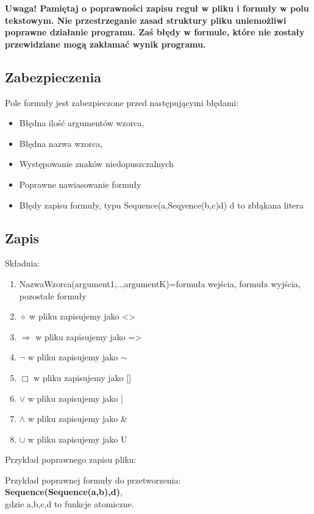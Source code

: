 \documentclass[a4paper, 11pt]{article}
\begin{document}
	\textbf{ Uwaga! Pamiętaj o poprawności zapisu reguł w pliku i formuły w polu tekstowym. Nie przestrzeganie zasad struktury pliku uniemożliwi poprawne działanie programu. Zaś błędy w formule, które nie zostały przewidziane mogą zakłamać wynik programu.}
	
	
	
	\subsection{Zabezpieczenia}
	Pole formuły jest zabezpieczone przed następującymi błędami:
	\begin{itemize}
	\item Błędna ilość argumentów wzorca,
	\item Błędna nazwa wzorca,
	\item Występowanie znaków niedopuszczalnych
	\item Poprawne nawiasowanie formuły
	\item Błędy zapisu formuły, typu Sequence(a,Seqyence(b,c)d) d to zbłąkana litera
	\end{itemize}
	\subsection{Zapis}
	Składnia:
		\begin{enumerate}
		\item NazwaWzorca(argument1,..,argumentK)={formuła wejścia, formuła wyjścia, pozostałe formuły}
		\item $ \diamond $ w pliku zapisujemy jako <>
		\item $\Rightarrow $ w pliku zapisujemy jako =>
		\item $\neg$ w pliku zapisujemy jako $\sim $
		\item $ \Box $ w pliku zapisujemy jako []
		\item $\vee $ w pliku zapisujemy jako |
		\item $ \wedge $ w pliku zapisujemy jako \&
		\item $\cup$ w pliku zapisujemy jako U
		
		\end{enumerate}
	
	
	Przykład poprawnego zapisu pliku:
	

	Przykład poprawnej formuły do przetworzenia:\\
	\textbf{Sequence(Sequence(a,b),d)},\\
	gdzie a,b,c,d to funkcje atomiczne.	\\
	
\end{document}

